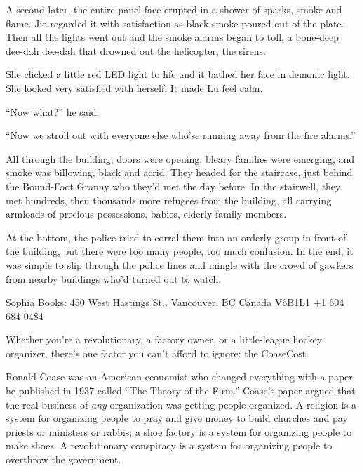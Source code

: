 A second later, the entire panel-face erupted in a shower of
sparks, smoke and flame. Jie regarded it with satisfaction as black
smoke poured out of the plate. Then all the lights went out and the
smoke alarms began to toll, a bone-deep dee-dah dee-dah that
drowned out the helicopter, the sirens.

She clicked a little red LED light to life and it bathed her face
in demonic light. She looked very satisfied with herself. It made
Lu feel calm.

``Now what?'' he said.

``Now we stroll out with everyone else who'se running away from the
fire alarms.''

All through the building, doors were opening, bleary families were
emerging, and smoke was billowing, black and acrid. They headed for
the staircase, just behind the Bound-Foot Granny who they'd met the
day before. In the stairwell, they met hundreds, then thousands
more refugees from the building, all carrying armloads of precious
possessions, babies, elderly family members.

At the bottom, the police tried to corral them into an orderly
group in front of the building, but there were too many people, too
much confusion. In the end, it was simple to slip through the
police lines and mingle with the crowd of gawkers from nearby
buildings who'd turned out to watch.

\tb

{\href{http://www.sophiabooks.com/}{Sophia Books}: 450 West Hastings St., Vancouver, BC Canada V6B1L1 +1 604 684 0484}

Whether you're a revolutionary, a factory owner, or a little-league
hockey organizer, there's one factor you can't afford to ignore:
the CoaseCost.

Ronald Coase was an American economist who changed everything with
a paper he published in 1937 called ``The Theory of the Firm.''
Coase's paper argued that the real business of \emph{any}
organization was getting people organized. A religion is a system
for organizing people to pray and give money to build churches and
pay priests or ministers or rabbis; a shoe factory is a system for
organizing people to make shoes. A revolutionary conspiracy is a
system for organizing people to overthrow the government.

